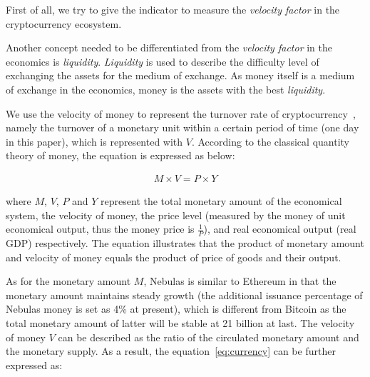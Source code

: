 First of all, we try to give the indicator to measure the \emph{velocity factor} in the cryptocurrency ecosystem. 

Another concept needed to be differentiated from the \emph{velocity factor} in the economics is \emph{liquidity}. \emph{Liquidity} is used to describe the difficulty level of exchanging the assets for the medium of exchange. As money itself is a medium of exchange in the economics, money is the assets with the best \emph{liquidity}.


We use the velocity of money to represent the turnover rate of cryptocurrency~\cite{selden}, namely the turnover of a monetary unit within a certain period of time (one day in this paper), which is represented with $V$. According to the classical quantity theory of money, the equation is expressed as below:

\begin{align}
M\times V=P\times Y
\label{eq:currency}
\end{align}

\noindent where $M$, $V$, $P$ and $Y$ represent the total monetary amount of the economical system, the velocity of money, the price level (measured by the money of unit economical output, thus the money price is $\frac{1}{P}$), and real economical output (real GDP) respectively. The equation illustrates that the product of monetary amount and velocity of money equals the product of price of goods and their output.

As for the monetary amount $M$, Nebulas is similar to Ethereum in that the monetary amount maintains steady growth (the additional issuance percentage of Nebulas money is set as 4\% at present), which is different from Bitcoin as the total monetary amount of latter will be stable at 21 billion at last. The velocity of money $V$ can be described as the ratio of the circulated monetary amount and the monetary supply. As a result, the equation~\ref{eq:currency} can be further expressed as:

